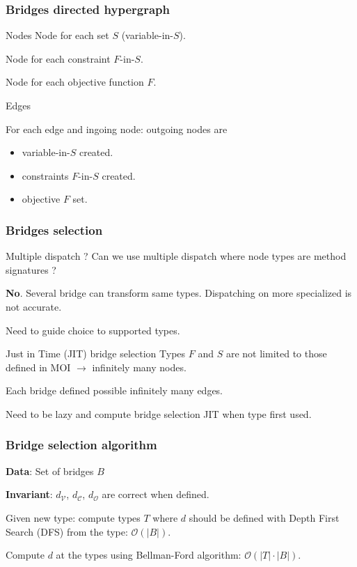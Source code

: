 \documentclass{beamer}
\begin{document}
\begin{frame}
  \frametitle{Bridges directed hypergraph}
  \vspace{-.2cm}
  \begin{block}{Nodes}
    Node for each set $S$ (variable-in-$S$).

    Node for each constraint $F$-in-$S$.

    Node for each objective function $F$.


  \end{block}
  \vspace{-.2cm}
  \begin{block}{Edges}

    For each edge and ingoing node: outgoing nodes are
    \begin{itemize}
        \item variable-in-$S$ created.
        \item constraints $F$-in-$S$ created.
        \item objective $F$ set.
    \end{itemize}
  \end{block}

\end{frame}

\begin{frame}
  \frametitle{Bridges selection}

  \begin{block}{Multiple dispatch ?}
    Can we use multiple dispatch where node types are method signatures ?

    \textbf{No}.
    Several bridge can transform same types.
    Dispatching on more specialized is not accurate.

    Need to guide choice to supported types.
  \end{block}

  \begin{block}{Just in Time (JIT) bridge selection}
    Types $F$ and $S$ are \alert{not limited} to those defined in MOI $\to$
    \alert{infinitely} many nodes.

    Each bridge defined possible \alert{infinitely} many edges.

    Need to be \alert{lazy} and compute bridge selection JIT when
    type first used.
  \end{block}

\end{frame}

\begin{frame}
  \frametitle{Bridge selection algorithm}
  \textbf{Data}: Set of bridges $B$

  \textbf{Invariant}: $d_\mathcal{V}$, $d_\mathcal{C}$, $d_\mathcal{O}$
  are correct when defined.

  Given new type: compute types $T$ where $d$ should be defined with
  Depth First Search (DFS) from the type: $\mathcal{O}(|B|)$.

  Compute $d$ at the types using Bellman-Ford algorithm: $\mathcal{O}(|T| \cdot |B|)$.
\end{frame}
\end{document}
